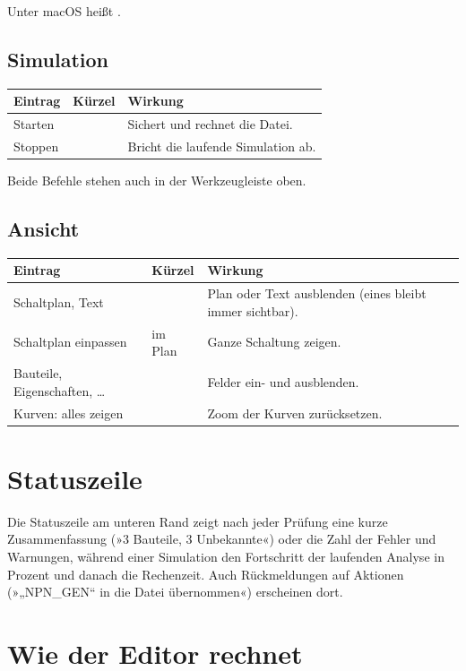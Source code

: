 Unter macOS heißt  .

\subsection*{Simulation}
\begin{tabularx}{\textwidth}{@{}lP{3.5cm}L@{}}
  \toprule
  Eintrag & Kürzel & Wirkung \\
  \midrule
  Starten &  & Sichert und rechnet die Datei. \\
  Stoppen &  & Bricht die laufende Simulation ab. \\
  \bottomrule
\end{tabularx}

Beide Befehle stehen auch in der Werkzeugleiste oben.

\subsection*{Ansicht}
\begin{tabularx}{\textwidth}{@{}lP{3.5cm}L@{}}
  \toprule
  Eintrag & Kürzel & Wirkung \\
  \midrule
  Schaltplan, Text & & Plan oder Text ausblenden (eines bleibt immer sichtbar). \\
  Schaltplan einpassen &  im Plan & Ganze Schaltung zeigen. \\
  Bauteile, Eigenschaften, \dots & & Felder ein- und ausblenden. \\
  Kurven: alles zeigen &  & Zoom der Kurven zurücksetzen. \\
  \bottomrule
\end{tabularx}

\section{Statuszeile}

Die Statuszeile am unteren Rand zeigt nach jeder Prüfung eine kurze
Zusammenfassung (»3 Bauteile, 3 Unbekannte«) oder die Zahl der Fehler und
Warnungen, während einer Simulation den Fortschritt der laufenden Analyse
in Prozent und danach die Rechenzeit. Auch Rückmeldungen auf Aktionen
(»„NPN\_GEN“ in die Datei übernommen«) erscheinen dort.

\section{Wie der Editor rechnet}

